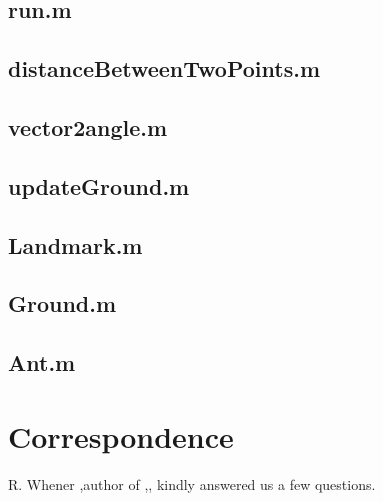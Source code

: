\documentclass[11pt]{article}
\begin{document}
\subsection{run.m} \label{run}


\subsection{distanceBetweenTwoPoints.m}\label{distancebetweenTwoPoints}

\subsection{vector2angle.m}\label{vector2angle}

\subsection{updateGround.m}\label{updateGround}

\subsection{Landmark.m}\label{Landmark}

\subsection{Ground.m}\label{Ground}

\subsection{Ant.m}\label{Ant}





\newpage


\section{Correspondence} \label{Sec:Correspondence}
R. Whener ,author of \cite{Wehner2003},\cite{Wehner1988}, \cite{Wehner1998} kindly answered us a few questions.\\
\end{document}
